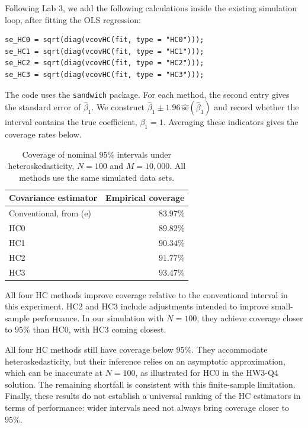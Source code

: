 \documentclass[11pt]{article}
\newcommand{\code}[1]{\texttt{#1}}
\begin{document}
Following Lab 3, we add the following calculations inside the existing
simulation loop, after fitting the OLS regression:
\begin{lstlisting}[style=Rcode]
se_HC0 = sqrt(diag(vcovHC(fit, type = "HC0")));
se_HC1 = sqrt(diag(vcovHC(fit, type = "HC1")));
se_HC2 = sqrt(diag(vcovHC(fit, type = "HC2")));
se_HC3 = sqrt(diag(vcovHC(fit, type = "HC3")));
\end{lstlisting}
The code uses the \code{sandwich} package. For each method, the second
entry gives the standard error of $\hat\beta_1$. We construct
$\hat\beta_1\pm1.96\,\widehat{\text{se}}(\hat\beta_1)$ and record
whether the interval contains the true coefficient, $\beta_1=1$.
Averaging these indicators gives the coverage rates below.

\begin{table}[htbp]
\centering
\caption{Coverage of nominal $95\%$ intervals under heteroskedasticity,
$N=100$ and $M=10{,}000$. All methods use the same simulated data sets.}
\label{tab:q4-hc-coverage}
\begin{tabular}{lr}
\toprule
Covariance estimator & Empirical coverage \\
\midrule
Conventional, from (e) & $83.97\%$ \\
HC0 & $89.82\%$ \\
HC1 & $90.34\%$ \\
HC2 & $91.77\%$ \\
HC3 & $93.47\%$ \\
\bottomrule
\end{tabular}
\end{table}

All four HC methods improve coverage relative to the conventional
interval in this experiment. HC2 and HC3 include adjustments intended
to improve small-sample performance. In our simulation with $N=100$,
they achieve coverage closer to $95\%$ than HC0, with HC3 coming closest.

All four HC methods still have coverage below $95\%$. They accommodate
heteroskedasticity, but their inference relies on an asymptotic
approximation, which can be inaccurate at $N=100$, as illustrated for
HC0 in the HW3-Q4 solution. The remaining shortfall is consistent with
this finite-sample limitation. Finally, these results do not establish
a universal ranking of the HC estimators in terms of performance:
wider intervals need not always bring coverage closer to $95\%$.
\end{document}
